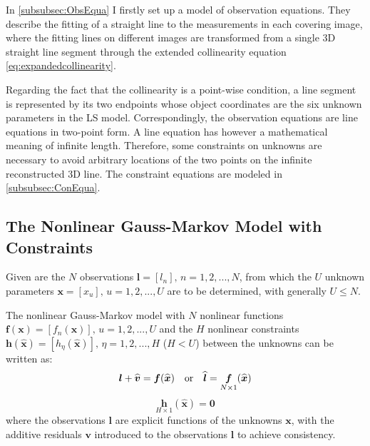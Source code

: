 In \cref{subsubsec:ObsEqua} I firstly set up a model of observation equations. They describe the fitting of a straight line to the measurements in each covering image, where the fitting lines on different images are transformed from a single 3D straight line segment through the extended collinearity equation \eqref{eq:expandedcollinearity}.

Regarding the fact that the collinearity is a point-wise condition, a line segment is represented by its two endpoints whose object coordinates are the six unknown parameters %
in the LS model. %
Correspondingly, the observation equations are line equations in two-point form. A line equation has however a mathematical meaning of infinite length. Therefore, some constraints on unknowns are necessary to avoid arbitrary locations of the two points on the infinite reconstructed 3D line. The constraint equations are modeled in \cref{subsubsec:ConEqua}.


\clearpage
\subsection{The Nonlinear Gauss-Markov Model with Constraints}
\label{GaussMarkovModelwithConstraints}

Given are the $N$ observations $\boldsymbol l=[l_n],\,n=1,2,...,N$, from which the $U$ unknown parameters $\boldsymbol x=[x_u],\,u=1,2,...,U$ are to be determined, with generally $U\leq N$.%

The nonlinear Gauss-Markov model with $N$ nonlinear functions $\boldsymbol f(\boldsymbol x)=[f_n(\boldsymbol x)],\,u=1,2,...,U$ and the $H$ nonlinear constraints $\boldsymbol h(\hat{\boldsymbol x})=[h_\eta(\hat{\boldsymbol x})],\,\eta=1,2,...,H$ %
($H<U$) between the unknowns can be written as:
\begin{equation} \label{eq:GM-ObsEq}
\boldsymbol l+\widehat{\boldsymbol v}=\boldsymbol f(\widehat{\boldsymbol x})\quad \textnormal{or}\quad \widehat{\boldsymbol l}=\underset{N\times 1}{\boldsymbol f}(\widehat{\boldsymbol x})
\end{equation}
\begin{equation} \label{eq:GM-ConEq}
\underset{H\times 1}{\boldsymbol h}(\widehat{\boldsymbol x})=\mathbf{0}
\end{equation}
where the observations $\boldsymbol l$ are explicit functions of the unknowns $\boldsymbol x$, with the additive residuals $\boldsymbol v$ introduced to the observations $\boldsymbol l$ to achieve consistency.

